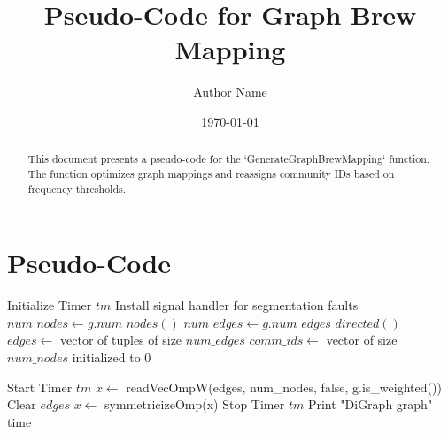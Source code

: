 \documentclass{article}
\begin{document}
\title{Pseudo-Code for Graph Brew Mapping}
\author{Author Name}
\date{\today}
\maketitle

\begin{abstract}
This document presents a pseudo-code for the `GenerateGraphBrewMapping` function. The function optimizes graph mappings and reassigns community IDs based on frequency thresholds.
\end{abstract}

\section{Pseudo-Code}

\begin{algorithm}[H]
\caption{\textcolor{blue}{GenerateGraphBrewMapping}}

\tcc{\textcolor{red}{Initialization}}
Initialize Timer $tm$ \tcp*{\textcolor{teal}{Timer setup}}
Install signal handler for segmentation faults \tcp*{\textcolor{teal}{Fault tolerance setup}}
$num\_nodes \leftarrow g.num\_nodes()$ \;
$num\_edges \leftarrow g.num\_edges\_directed()$ \;
$edges \leftarrow$ vector of tuples of size $num\_edges$ \;
$comm\_ids \leftarrow$ vector of size $num\_nodes$ initialized to $0$ \;

\tcc{\textcolor{red}{Construct the Edge List}}

\tcc{\textcolor{red}{Graph Processing}}
Start Timer $tm$ \;
$x \leftarrow$ readVecOmpW(edges, num\_nodes, false, g.is\_weighted()) \;
Clear $edges$ \;
$x \leftarrow$ symmetricizeOmp(x) \;
Stop Timer $tm$ \;
Print "DiGraph graph" time \;


\end{algorithm}
\end{document}
